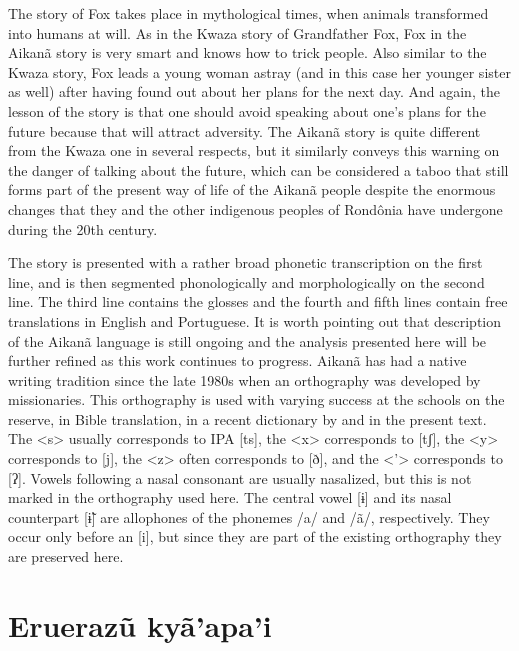\documentclass[output=paper,
modfonts,nonflat
]{langsci/langscibook}
\begin{document}
The story of Fox takes place in mythological times, when animals transformed into humans at will. As in the Kwaza story of Grandfather Fox, Fox in the Aikanã story is very smart and knows how to trick people. Also similar to the Kwaza story, Fox leads a young woman astray (and in this case  her younger sister as well)  after having found out about her plans for the next day. And again, the lesson of the story is that one should avoid speaking about one’s plans for the future because that will attract adversity. The Aikanã story is quite different from the Kwaza one in several respects, but it similarly conveys this warning on the danger of talking about the future, which can be considered a taboo that still forms part of the present way of life of the Aikanã people despite the enormous changes that they and the other indigenous peoples of Rondônia have undergone during the 20th century.

The story is presented with a rather broad phonetic transcription on the first line, and is then segmented phonologically and morphologically on the second line. The third line contains the glosses and the fourth and fifth lines contain free translations in English and Portuguese. 
It is worth pointing out that description of the Aikanã language is still ongoing and the analysis presented here will be further refined as this work continues to progress. Aikanã has had a native writing tradition since the late 1980s when an orthography was developed by missionaries. This orthography is used with varying success at the schools on the reserve, in Bible translation, in a recent dictionary by \citet{Silva2013} and in the present text. The <s> usually corresponds to IPA [ts], the <x> corresponds to [tʃ], the <y> corresponds to [j], the <z> often corresponds to [ð], and the <'> corresponds to [ʔ]. Vowels following a nasal consonant are usually nasalized, but this is not marked in the orthography used here. The central vowel [ɨ] and its nasal counterpart [ɨ̃] are allophones of the phonemes /a/ and /ã/, respectively. They occur only before an [i], but since they are part of the existing orthography they are preserved here. 




\section{Eruerazũ kyã’apa’i}
\end{document}
